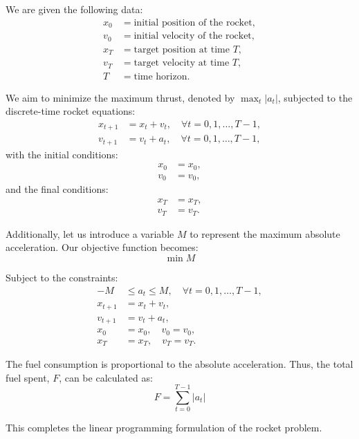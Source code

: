 \documentclass{article}
\begin{document}
We are given the following data:
\begin{align*}
x_0 &= \text{initial position of the rocket}, \\
v_0 &= \text{initial velocity of the rocket}, \\
x_T &= \text{target position at time } T, \\
v_T &= \text{target velocity at time } T, \\
T &= \text{time horizon}.
\end{align*}

We aim to minimize the maximum thrust, denoted by $\max_t |a_t|$, subjected to the discrete-time rocket equations:
\begin{align}
x_{t+1} &= x_t + v_t, \quad \forall t = 0, 1, \ldots, T-1, \\
v_{t+1} &= v_t + a_t, \quad \forall t = 0, 1, \ldots, T-1,
\end{align}
with the initial conditions:
\begin{align}
x_0 &= x_0, \\
v_0 &= v_0,
\end{align}
and the final conditions:
\begin{align}
x_T &= x_T, \\
v_T &= v_T.
\end{align}

Additionally, let us introduce a variable $M$ to represent the maximum absolute acceleration. Our objective function becomes:
\[
\min M
\]

Subject to the constraints:
\begin{align}
-M &\leq a_t \leq M, \quad \forall t = 0, 1, \ldots, T-1, \\
x_{t+1} &= x_t + v_t, \\
v_{t+1} &= v_t + a_t, \\
x_0 &= x_0, \quad v_0 = v_0, \\
x_T &= x_T, \quad v_T = v_T.
\end{align}

The fuel consumption is proportional to the absolute acceleration. Thus, the total fuel spent, $F$, can be calculated as:
\[
F = \sum_{t=0}^{T-1} |a_t|
\]

This completes the linear programming formulation of the rocket problem.
\end{document}
